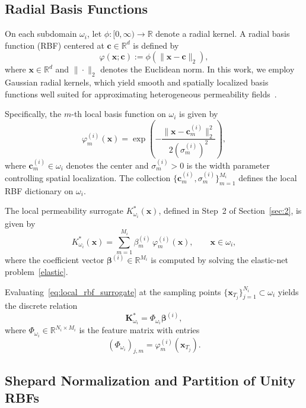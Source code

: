\documentclass[final,1p,times]{elsarticle}
\theoremstyle{plain}
\theoremstyle{definition}
\theoremstyle{remark}
\newcommand{\bx}{\mathbf{x}}
\newcommand{\bK}{\mathbf{K}}
\newcommand{\bc}{\mathbf{c}}
\begin{document}
\subsection{Radial Basis Functions}

On each subdomain $\omega_i$, let $\phi:[0,\infty)\to\mathbb{R}$ denote a radial kernel. A radial basis function (RBF) centered at $\bc\in\mathbb{R}^d$ is defined by
\begin{equation}
\varphi(\bx;\bc) := \phi(\|\bx-\bc\|_2),
\end{equation}
where $\bx\in\mathbb{R}^d$ and $\|\cdot\|_2$ denotes the Euclidean norm. In this work, we employ Gaussian radial kernels, which yield smooth and spatially localized basis functions well suited for approximating heterogeneous permeability fields~\cite{buhmann2003rbf}.

Specifically, the $m$-th local basis function on $\omega_i$ is given by
\begin{equation}
\varphi_m^{(i)}(\bx)
=
\exp\!\left(-\frac{\|\bx-\bc_m^{(i)}\|_2^2}{2(\sigma_m^{(i)})^2}\right),
\label{eq:gaussian_rbf}
\end{equation}
where  {$\bc_m^{(i)}\in\omega_i$} denotes the center and $\sigma_m^{(i)}>0$ is the width parameter controlling spatial localization. The collection $\{\bc_m^{(i)},\sigma_m^{(i)}\}_{m=1}^{M_i}$ defines the local RBF dictionary on $\omega_i$.

The local permeability surrogate $K^*_{\omega_i}(\bx)$, defined in Step~2 of Section~\ref{sec:2}, is given by
\begin{equation}
K^*_{\omega_i}(\bx)
=
\sum_{m=1}^{M_i} \beta_m^{(i)} \,\varphi_m^{(i)}(\bx),
\qquad \bx\in\omega_i,
\label{eq:local_rbf_surrogate}
\end{equation}
where the coefficient vector $\boldsymbol{\beta}^{(i)}\in\mathbb{R}^{M_i}$ is computed by solving the elastic-net problem~\eqref{elastic}.

Evaluating~\eqref{eq:local_rbf_surrogate} at the sampling points $\{\bx_{T_j}\}_{j=1}^{N_i}\subset\omega_i$ yields the discrete relation
\begin{equation}
\bK^*_{\omega_i}
=
\Phi_{\omega_i}\boldsymbol{\beta}^{(i)},
\end{equation}
where $\Phi_{\omega_i}\in\mathbb{R}^{N_i\times M_i}$ is the feature matrix with entries
$$
(\Phi_{\omega_i})_{j,m}=\varphi_m^{(i)}(\bx_{T_j}).
$$


\subsection{Shepard Normalization and Partition of Unity RBFs}
\label{subsec:shepard}
\end{document}
